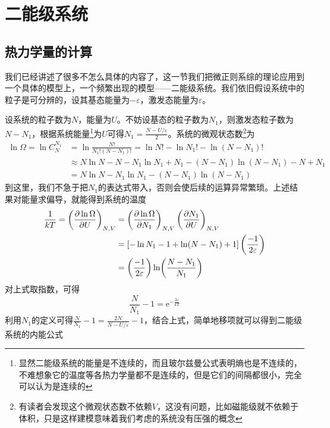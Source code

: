 \documentclass[../../main.tex]{subfiles}
\begin{document}
\section{二能级系统}
\subsection{热力学量的计算}
我们已经讲述了很多不怎么具体的内容了，这一节我们把微正则系综的理论应用到一个具体的模型上，一个频繁出现的模型——二能级系统。我们依旧假设系统中的粒子是可分辨的，设其基态能量为\(-\varepsilon\)，激发态能量为\(\varepsilon\)。

设系统的粒子数为\(N\)，能量为\(U\)。不妨设基态的粒子数为\(N_1\)，则激发态粒子数为\(N-N_1\)，根据系统能量\footnote{显然二能级系统的能量是不连续的，而且玻尔兹曼公式表明熵也是不连续的，不难想象它的温度等各热力学量都不是连续的，但是它们的间隔都很小，完全可以认为是连续的}为\(U\)可得\(N_1=\frac{N-U/\varepsilon}{2}\)。系统的微观状态数\footnote{有读者会发现这个微观状态数不依赖\(V\)，这没有问题，比如磁能级就不依赖于体积，只是这样建模意味着我们考虑的系统没有压强的概念}为
\begin{equation*}
    \begin{split}
        \ln \Omega=\ln C_N^{N_1}&=\ln \frac{N!}{N_1!(N-N_1)!}=\ln N!-\ln N_1!-\ln (N-N_1)! \\
        &\approx N\ln N-N-N_1\ln N_1+N_1-(N-N_1)\ln(N-N_1)-N+N_1 \\
        &=N\ln N-N_1\ln N_1-(N-N_1)\ln(N-N_1)
    \end{split}
\end{equation*}
到这里，我们不急于把\(N_1\)的表达式带入，否则会使后续的运算异常繁琐。上述结果对能量求偏导，就能得到系统的温度
\begin{equation*}
    \begin{split}
        \frac{1}{kT}=\left(\pdv{\ln \Omega}{U}\right)_{N,V}&=\left(\pdv{\ln \Omega}{N_1}\right)_{N,V}\left(\pdv{N_1}{U}\right)_{N,V} \\
        &=\left[-\ln N_1-1+\ln(N-N_1)+1\right]\left(\frac{-1}{2\varepsilon}\right) \\
        &=\left(\frac{-1}{2\varepsilon}\right)\ln(\frac{N-N_1}{N_1})
    \end{split}
\end{equation*}
对上式取指数，可得
\begin{equation*}
    \frac{N}{N_1}-1=\mathrm{e}^{-\frac{2\varepsilon}{kT}}
\end{equation*}
利用\(N_1\)的定义可得\(\frac{N}{N_1}-1=\frac{2N}{N-U/\varepsilon}-1\)，结合上式，简单地移项就可以得到二能级系统的内能公式
\end{document}
